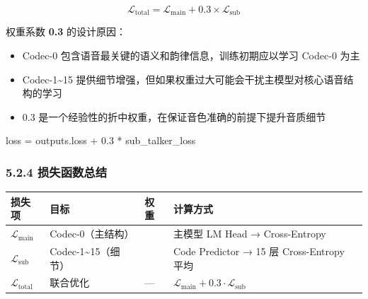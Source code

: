 \documentclass[
  english,
  letterpaper,
  DIV=11,
  numbers=noendperiod]{scrartcl}
\newenvironment{Shaded}{\begin{snugshade}}{\end{snugshade}}
\newcommand{\FloatTok}[1]{\textcolor[rgb]{0.68,0.00,0.00}{#1}}
\newcommand{\NormalTok}[1]{\textcolor[rgb]{0.00,0.23,0.31}{#1}}
\newcommand{\OperatorTok}[1]{\textcolor[rgb]{0.37,0.37,0.37}{#1}}
\newcounter{none} %
\providecommand{\tightlist}{%
  \setlength{\itemsep}{0pt}\setlength{\parskip}{0pt}}
\begin{document}
\[\mathcal{L}_{\text{total}} = \mathcal{L}_{\text{main}} + 0.3 \times \mathcal{L}_{\text{sub}}\]

权重系数 \textbf{0.3} 的设计原因：

\begin{itemize}
\tightlist
\item
  Codec-0 包含语音最关键的语义和韵律信息，训练初期应以学习 Codec-0 为主
\item
  Codec-1\textasciitilde15
  提供细节增强，但如果权重过大可能会干扰主模型对核心语音结构的学习
\item
  0.3 是一个经验性的折中权重，在保证音色准确的前提下提升音质细节
\end{itemize}

\begin{Shaded}
\begin{Highlighting}[]
\NormalTok{loss }\OperatorTok{=}\NormalTok{ outputs.loss }\OperatorTok{+} \FloatTok{0.3} \OperatorTok{*}\NormalTok{ sub\_talker\_loss}
\end{Highlighting}
\end{Shaded}

\subsubsection{5.2.4
损失函数总结}\label{ux635fux5931ux51fdux6570ux603bux7ed3}

{\def\LTcaptype{none} %
\begin{longtable}[]{@{}
  >{\raggedright\arraybackslash}p{}
  >{\raggedright\arraybackslash}p{}
  >{\raggedright\arraybackslash}p{}
  >{\raggedright\arraybackslash}p{}@{}}
\toprule\noalign{}
\begin{minipage}[b]{\linewidth}\raggedright
损失项
\end{minipage} & \begin{minipage}[b]{\linewidth}\raggedright
目标
\end{minipage} & \begin{minipage}[b]{\linewidth}\raggedright
权重
\end{minipage} & \begin{minipage}[b]{\linewidth}\raggedright
计算方式
\end{minipage} \\
\midrule\noalign{}
\endhead
\bottomrule\noalign{}
\endlastfoot
\(\mathcal{L}_{\text{main}}\) & Codec-0（主结构） & 1.0 & 主模型 LM Head
→ Cross-Entropy \\
\(\mathcal{L}_{\text{sub}}\) & Codec-1\textasciitilde15（细节） & 0.3 &
Code Predictor → 15 层 Cross-Entropy 平均 \\
\(\mathcal{L}_{\text{total}}\) & 联合优化 & --- &
\(\mathcal{L}_{\text{main}} + 0.3 \cdot \mathcal{L}_{\text{sub}}\) \\
\end{longtable}
}
\end{document}
